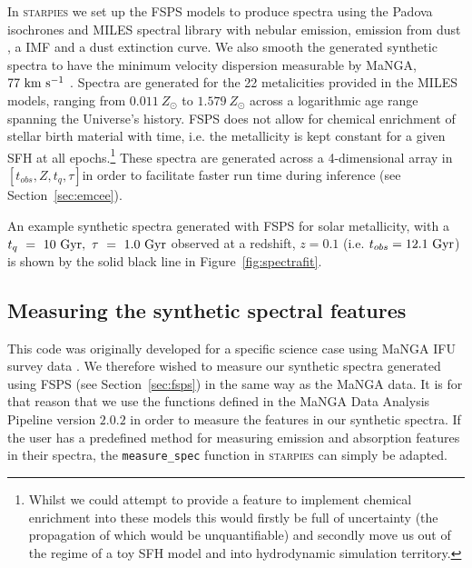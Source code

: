 \documentclass[useAMS,usenatbib]{mn2e}
\def\check		{\color{check}}
\begin{document}
In \textsc{starpies} we set up the FSPS models to produce spectra using the Padova isochrones \citep{girardi02} and MILES spectral library \citep{vazdekis16} with nebular emission, emission from dust \cite{draineli07}, a \cite{chabrier03} IMF and a \cite{calzetti00} dust extinction curve. We also smooth the generated synthetic spectra to have the minimum velocity dispersion measurable by MaNGA, $77~\rm{km}~{s}^{-1}$ \citep{bundy15}. Spectra are generated for the 22 metalicities provided in the MILES models, ranging from $0.011~Z_{\odot}$ to $1.579~Z_{\odot}$ across a logarithmic age range spanning the Universe's history. FSPS does not allow for chemical enrichment of stellar birth material with time, i.e. the metallicity is kept constant for a given SFH at all epochs.\footnote{Whilst we could attempt to provide a feature to implement chemical enrichment into these models this would firstly be full of uncertainty (the propagation of which would be unquantifiable) and secondly move us out of the regime of a toy SFH model and into hydrodynamic simulation territory. } These spectra are generated across a 4-dimensional array in $[t_{obs}, Z, t_q, \tau]$in order to facilitate faster run time during inference (see Section~\ref{sec:emcee}).

An example synthetic spectra generated with FSPS for solar metallicity, with a {\check $t_q~=~10~\rm{Gyr},~\tau~=~1.0~\rm{Gyr}$ observed at a redshift, $z=0.1$ (i.e. $t_{obs}=12.1~\rm{Gyr}$)} is shown by the solid black line in Figure~\ref{fig:spectrafit}.

\subsection{Measuring the synthetic spectral features}\label{sec:dap}

This code was originally developed for a specific science case using MaNGA IFU survey data \citep[an integral-field spectroscopic survey of 10,000 galaxies undertaken by the fourth phase of the Sloan Digital Sky Survey, SDSS-IV; ][]{bundy15}. We therefore wished to measure our synthetic spectra generated using FSPS (see Section~\ref{sec:fsps}) in the same way as the MaNGA data. It is for that reason that we use the functions defined in the MaNGA Data Analysis Pipeline \citep[DAP;][]{westfall18} version $2.0.2$ in order to measure the features in our synthetic spectra. If the user has a predefined method for measuring emission and absorption features in their spectra, the \texttt{measure\_spec} function in \textsc{starpies} can simply be adapted.
\end{document}
